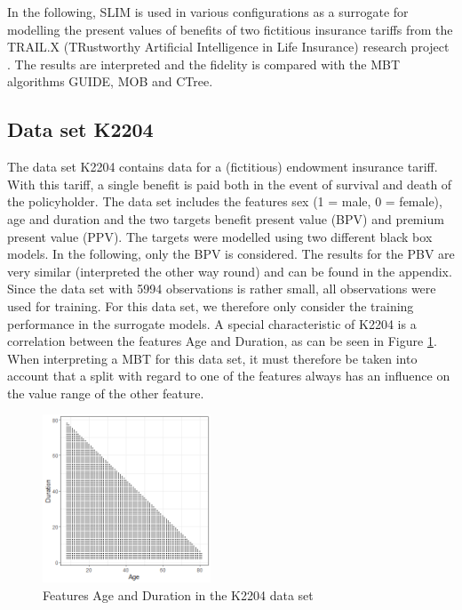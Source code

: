 In the following, SLIM is used in various configurations as a surrogate for modelling the present values of benefits of two fictitious insurance tariffs from the TRAIL.X (TRustworthy Artificial Intelligence in Life Insurance) research project \citep{msginsurit.16.03.2023}. The results are interpreted and the fidelity is compared with the MBT algorithms GUIDE, MOB and CTree.

\subsection{Data set K2204}
The data set K2204 contains data for a (fictitious) endowment insurance tariff. With this tariff, a single benefit is paid both in the event of survival and death of the policyholder. The data set includes the features sex (1 = male, 0 = female), age and duration and the two targets benefit present value (BPV) and premium present value (PPV). The targets were modelled using two different black box models.  
In the following, only the BPV is considered. The results for the PBV are very similar (interpreted the other way round) and can be found in the appendix.
Since the data set with 5994 observations is rather small, all observations were used for training. For this data set, we therefore only consider the training performance in the surrogate models.
A special characteristic of K2204 is a correlation between the features Age and Duration, as can be seen in Figure \ref{fig:ins_corr_age_duration}. When interpreting a MBT for this data set, it must therefore be taken into account that a split with regard to one of the features always has an influence on the value range of the other feature.

\begin{figure}[!htb]
    \centering    
    \includegraphics[width=5cm]{Figures/insurance_use_case/k2204_BPV/corr_age_duration.png}
    \caption{Features Age and Duration in the K2204 data set}
    \label{fig:ins_corr_age_duration}
\end{figure}


